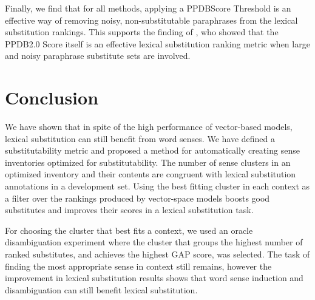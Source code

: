 \documentclass[11pt]{article}
\begin{document}
Finally, we find that for all methods, applying a PPDBScore Threshold is an effective way of removing noisy, non-substitutable paraphrases from the lexical substitution rankings. This supports the finding of , who showed that the PPDB2.0 Score itself is an effective lexical substitution ranking metric when large and noisy paraphrase substitute sets are involved.



\section{Conclusion}

We have shown that in spite of the high performance of vector-based models, lexical substitution can still benefit from word senses. We have defined a substitutability metric and proposed a method for automatically creating sense inventories optimized for substitutability. The number of sense clusters in an optimized inventory and their contents are congruent with lexical substitution annotations in a development set. Using the best fitting cluster in each context as a filter over the rankings produced by vector-space models boosts good substitutes and improves their scores in a lexical substitution task. 

For choosing the cluster that best fits a context, we used an oracle disambiguation experiment where the cluster that groups the highest number of ranked substitutes, and achieves the highest GAP score, was selected. The task of finding the most appropriate sense in context still remains, however the improvement in lexical substitution results shows that word sense induction and disambiguation can still benefit lexical substitution.   




\end{document}

